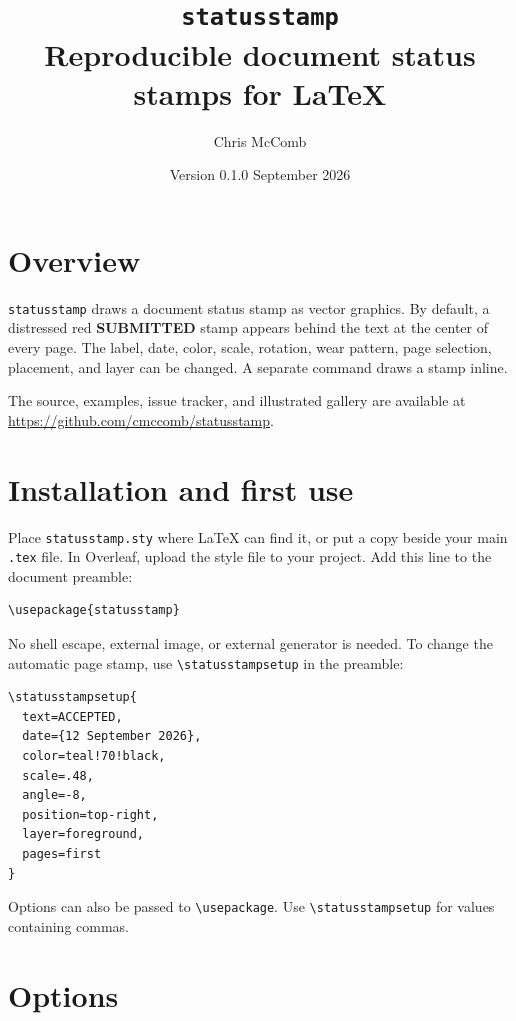 \documentclass[11pt]{article}
\title{\texttt{statusstamp}\\[0.35em]\large Reproducible document status stamps for LaTeX}
\author{Chris McComb}
\date{Version 0.1.0 \quad 12 September 2026}
\begin{document}
\maketitle

\section{Overview}

\texttt{statusstamp} draws a document status stamp as vector graphics. By
default, a distressed red \textbf{SUBMITTED} stamp appears behind the text at
the center of every page. The label, date, color, scale, rotation, wear
pattern, page selection, placement, and layer can be changed. A separate
command draws a stamp inline.

The source, examples, issue tracker, and illustrated gallery are available at
\url{https://github.com/cmccomb/statusstamp}.

\section{Installation and first use}

Place \texttt{statusstamp.sty} where LaTeX can find it, or put a copy beside
your main \texttt{.tex} file. In Overleaf, upload the style file to your
project. Add this line to the document preamble:

\begin{verbatim}
\usepackage{statusstamp}
\end{verbatim}

No shell escape, external image, or external generator is needed. To change
the automatic page stamp, use \verb|\statusstampsetup| in the preamble:

\begin{verbatim}
\statusstampsetup{
  text=ACCEPTED,
  date={12 September 2026},
  color=teal!70!black,
  scale=.48,
  angle=-8,
  position=top-right,
  layer=foreground,
  pages=first
}
\end{verbatim}

Options can also be passed to \verb|\usepackage|. Use
\verb|\statusstampsetup| for values containing commas.

\section{Options}
\end{document}
